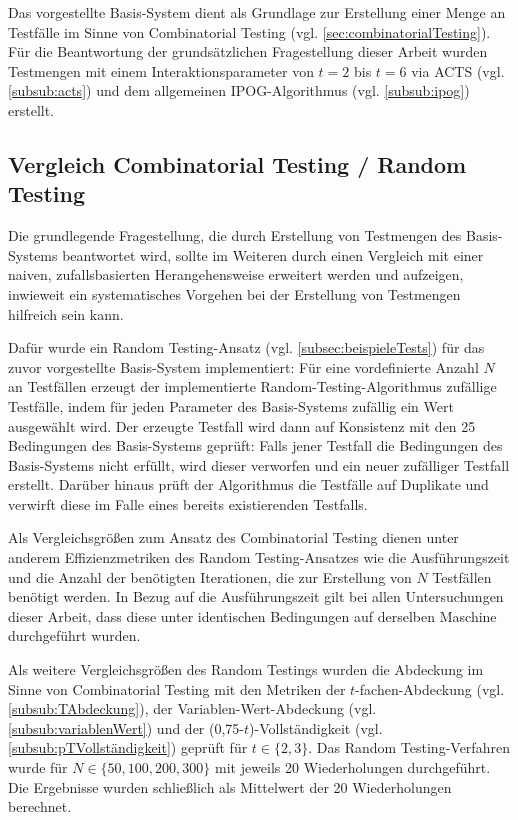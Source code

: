 \renewcommand{\arraystretch}{1.5}

Das vorgestellte Basis-System dient als Grundlage zur Erstellung einer Menge an Testfälle im Sinne von Combinatorial Testing (vgl. \autoref{sec:combinatorialTesting}). Für die Beantwortung der grundsätzlichen Fragestellung dieser Arbeit wurden Testmengen mit einem Interaktionsparameter von $t = 2$ bis $t = 6$ via ACTS (vgl. \autoref{subsub:acts}) und dem allgemeinen IPOG-Algorithmus (vgl. \autoref{subsub:ipog}) erstellt.


\subsection{Vergleich Combinatorial Testing / Random Testing}\label{subsec:ImplRandomTesting}

Die grundlegende Fragestellung, die durch Erstellung von Testmengen des Basis-Systems beantwortet wird, sollte im Weiteren durch einen Vergleich mit einer naiven, zufallsbasierten Herangehensweise erweitert werden und aufzeigen, inwieweit ein systematisches Vorgehen bei der Erstellung von Testmengen hilfreich sein kann. 

Dafür wurde ein Random Testing-Ansatz (vgl. \autoref{subsec:beispieleTests}) für das zuvor vorgestellte Basis-System implementiert: Für eine vordefinierte Anzahl $N$ an Testfällen erzeugt der implementierte Random-Testing-Algorithmus zufällige Testfälle, indem für jeden Parameter des Basis-Systems zufällig ein Wert ausgewählt wird. Der erzeugte Testfall wird dann auf Konsistenz mit den 25 Bedingungen des Basis-Systems geprüft: Falls jener Testfall die Bedingungen des Basis-Systems nicht erfüllt, wird dieser verworfen und ein neuer zufälliger Testfall erstellt. Darüber hinaus prüft der Algorithmus die Testfälle auf Duplikate und verwirft diese im Falle eines bereits existierenden Testfalls.

Als Vergleichsgrößen zum Ansatz des Combinatorial Testing dienen unter anderem Effizienzmetriken des Random Testing-Ansatzes wie die Ausführungszeit und die Anzahl der benötigten Iterationen, die zur Erstellung von $N$ Testfällen benötigt werden. In Bezug auf die Ausführungszeit gilt bei allen Untersuchungen dieser Arbeit, dass diese unter identischen Bedingungen auf derselben Maschine durchgeführt wurden. 

Als weitere Vergleichsgrößen des Random Testings wurden die Abdeckung im Sinne von Combinatorial Testing mit den Metriken der $t$-fachen-Abdeckung (vgl. \autoref{subsub:TAbdeckung}), der Variablen-Wert-Abdeckung (vgl. \autoref{subsub:variablenWert}) und der (0,75-$t$)-Vollständigkeit (vgl. \autoref{subsub:pTVollständigkeit}) geprüft für $t \in \{2,3\}$. Das Random Testing-Verfahren wurde für $N \in \{50, 100, 200, 300\}$ mit jeweils 20 Wiederholungen durchgeführt. Die Ergebnisse wurden schließlich als Mittelwert der 20 Wiederholungen berechnet.


